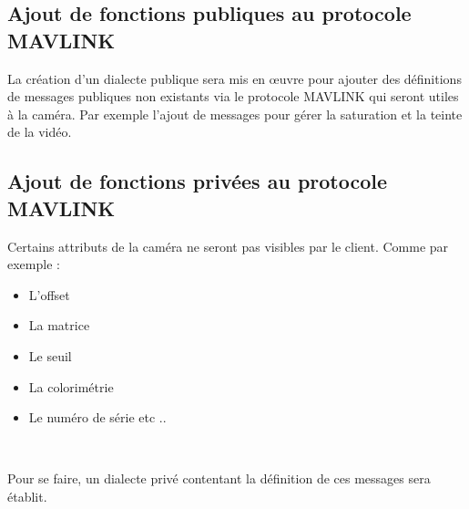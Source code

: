 \subsection{Ajout de fonctions publiques au protocole MAVLINK}

La création d’un dialecte publique sera mis en œuvre pour ajouter des définitions de messages publiques non existants via le protocole MAVLINK qui seront utiles à la caméra.
Par exemple l'ajout de messages pour gérer la saturation et la teinte de la vidéo. 

\subsection{Ajout de fonctions privées au protocole MAVLINK}

Certains attributs de la caméra ne seront pas visibles par le client. Comme par exemple :  
\begin{itemize}
	\item L'offset
	\item La matrice
	\item Le seuil  
	\item La colorimétrie
	\item Le numéro de série etc ..

\end{itemize}
\

Pour se faire, un dialecte privé contentant la définition de ces messages sera établit. 
